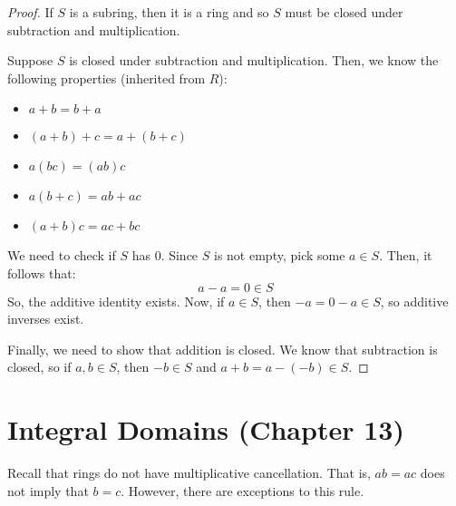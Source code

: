 \documentclass[letterpaper]{article}
\begin{document}
\begin{mdframed}[]
    \begin{proof}
        If $S$ is a subring, then it is a ring and so $S$ must be closed under subtraction and multiplication. 

        \bigskip 

        Suppose $S$ is closed under subtraction and multiplication. Then, we know the following properties (inherited from $R$): 
        \begin{itemize}
            \item $a + b = b + a$
            \item $(a + b) + c = a + (b + c)$
            \item $a(bc) = (ab)c$
            \item $a(b + c) = ab + ac$
            \item $(a + b)c = ac + bc$
        \end{itemize}
        We need to check if $S$ has 0. Since $S$ is not empty, pick some $a \in S$. Then, it follows that: 
        \[a - a = 0 \in S\]
        So, the additive identity exists. Now, if $a \in S$, then $-a = 0 - a \in S$, so additive inverses exist. 

        \bigskip 

        Finally, we need to show that addition is closed. We know that subtraction is closed, so if $a, b \in S$, then $-b \in S$ and $a + b = a - (-b) \in S$. 
    \end{proof}
\end{mdframed}



















\newpage 
\section{Integral Domains (Chapter 13)}
Recall that rings do not have multiplicative cancellation. That is, $ab = ac$ does not imply that $b = c$. However, there are exceptions to this rule.
\end{document}
